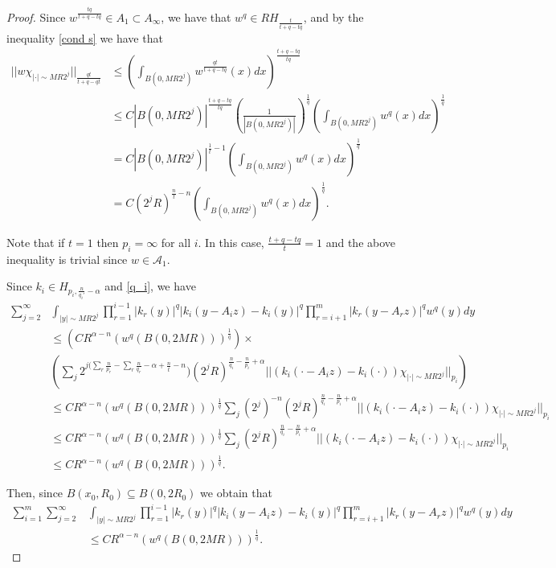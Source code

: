 \documentclass[a4paper,12pt,reqno]{amsart}
\numberwithin{equation}{section}
\begin{document}
\begin{proof}
		Since $w^{\frac {tq}{t+q-tq}}\in A_1 \subset A_{\infty}$, we have that $ w^{q} \in RH_{\frac{t}{t+q-tq}}$, and by the inequality \ref{cond s} we have that 
		$$\begin{aligned}
			||w \chi_{|\cdot|\sim M R2^{j}}||_{\frac {qt}{t+q-qt}}& \leq \left(\int_{B(0,MR2^{j})} w^{\frac{qt}{t+q-tq}}(x) dx \right)^{\frac{t+q-tq}{tq}}\\
			&\leq C |B(0,MR2^{j})|^{\frac{t+q-tq}{tq}} (\frac{1}{|B(0,MR2^{j})|})^{\frac{1}{q}} \left(\int_{B(0,MR2^{j})} w^{q}(x) dx\right)^{\frac{1}{q}}\\
			&=C |B(0,MR2^{j})|^{\frac{1}{t}-1} \left(\int_{B(0,MR2^{j})} w^{q}(x) dx \right)^{\frac{1}{q}} \\
			&= C (2^{j}R)^{\frac{n}{t}-n} \left(\int_{B(0,MR2^{j})} w^{q}(x) dx\right)^{\frac{1}{q}}.
		\end{aligned}$$
		
		Note that if $t=1$ then $p_i=\infty$ for all $i$. In this case, $\frac{t+q-tq}{t}=1$ and the above inequality is trivial since $w \in \mathcal{A}_1$.
		
		
		Since $k_i\in H_{p_i, \frac n{q_i'}-\alpha}$ and \eqref{q_i}, we have 
		$$\begin{aligned}
			\sum_{j=2}^\infty &\int_{|y|\sim M R2^{j}} \prod_{r=1}^{i-1}|k_r(y)|^{q}|k_i(y-A_iz)-k_i(y)|^q\prod_{r=i+1}^m |k_{r}(y-A_rz)|^q w^q(y)dy\\
			&\leq \left( CR^{\alpha-n}(w^{q}(B(0,2MR)))^{\frac 1q}\right) \times\\
			& \left(\sum_j 2^{j( \sum_r \frac n{p_r}-\sum_r \frac n{q_r}- \alpha+\frac{n}t-n } )(2^jR)^{\frac n{q_i}-\frac n{p_i} +\alpha} ||(k_i(\cdot-A_iz )-k_i(\cdot))\chi_{|\cdot|\sim M R2^{j}}||_{p_i}\right)\\
			&\leq CR^{\alpha-n}(w^{q}(B(0,2MR)))^{\frac 1q}\sum_j (2^j)^{-n}(2^jR)^{\frac n{q_i}-\frac n{p_i} +\alpha} ||(k_i(\cdot-A_iz )-k_i(\cdot))\chi_{|\cdot|\sim M R2^{j}}||_{p_i}\\
			&\leq CR^{\alpha-n}(w^{q}(B(0,2MR)))^{\frac 1q}\sum_j (2^jR)^{\frac n{q_i}-\frac n{p_i} +\alpha} ||(k_i(\cdot-A_iz )-k_i(\cdot))\chi_{|\cdot|\sim M R2^{j}}||_{p_i}\\
			&\leq  CR^{\alpha-n}(w^{q}(B(0,2MR)))^{\frac 1q}.
		\end{aligned}
		$$
		
		Then, since $B(x_0,R_0) \subseteq B(0,2R_0)$ we obtain that
		$$\begin{aligned}
			\sum_{i=1}^{m} \sum_{j=2}^\infty &\int_{|y|\sim M R2^{j}} \prod_{r=1}^{i-1}|k_r(y)|^{q}|k_i(y-A_iz)-k_i(y)|^q\prod_{r=i+1}^m |k_{r}(y-A_rz)|^q w^q(y)dy\\
			& \leq CR^{\alpha-n}(w^{q}(B(0,2MR)))^{\frac 1q}.
		\end{aligned}
		$$
		

\end{proof}
\end{document}
